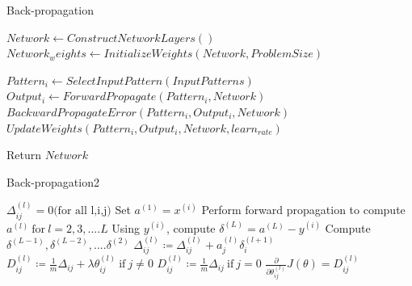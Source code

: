 \documentclass[a4paper]{article}
\begin{document}
  \begin{algorithm}
   \caption{Back-propagation  ~\cite{backpropagation12}}
    \begin{algorithmic}[1]
     \State $Network \leftarrow ConstructNetworkLayers()$
     \State $Network_weights \leftarrow InitializeWeights(Network,ProblemSize)$
    
            \State $Pattern_i \leftarrow SelectInputPattern(InputPatterns)$
            \State $Output_i \leftarrow ForwardPropagate(Pattern_i,Network)$
            \State $BackwardPropagateError(Pattern_i,Output_i,Network)$
            \State $UpdateWeights(Pattern_i,Output_i,Network,learn_{rate})$
        \EndFor
        
       
       \State Return $Network$



 

\end{algorithmic}
\end{algorithm}


\begin{algorithm}
   \caption{Back-propagation2 ~\cite{backpropagation2} }
    \begin{algorithmic}[1]
    \State $\Delta_{ij}^{(l)} = 0 \text{(for all l,i,j)}$
     \State Set $a^{(1)} = x ^ {(i)}$
     \State Perform forward propagation to compute $a^{(l)} \  \text{for} \  l =2,3,....L$
     \State Using $y^(i)$, compute $\delta^(L) = a^(L) - y^(i)$
     \State Compute $\delta^(L-1),\delta^(L-2),....\delta^(2) $
    \State $\Delta_{ij}^{(l)} \coloneqq \Delta_{ij}^{(l)} + a_{j}^{(l)}\delta_{i}^{(l+1)} $
      \EndFor
      \State $D_{ij}^{(l)} \coloneqq \frac{1}{m} \Delta_{ij} + \lambda \theta_{ij}^{(l)} \  \text{if}\  j \neq 0 $
      \State $D_{ij}^{(l)} \coloneqq \frac{1}{m} \Delta_{ij} \  \text{if}\  j = 0 $
      \State $\frac{\partial}{\partial\theta_{ij}^{(l)}}J(\theta) = D_{ij}^(l)$ 
      
    
    
    
\end{algorithmic}
\end{algorithm}
\end{document}
